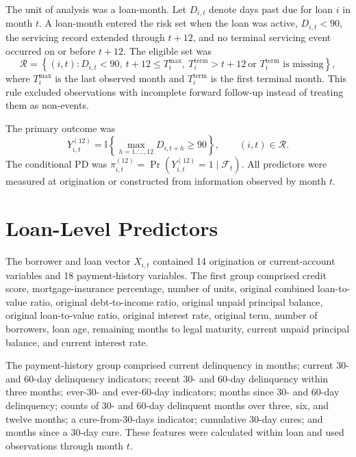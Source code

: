 The unit of analysis was a loan-month. Let $D_{i,t}$ denote days past due for loan $i$ in month $t$. A loan-month entered the risk set when the loan was active, $D_{i,t}<90$, the servicing record extended through $t+12$, and no terminal servicing event occurred on or before $t+12$. The eligible set was
\begin{equation}
\mathcal{R}
=
\left\{(i,t):D_{i,t}<90,\ t+12\leq T_i^{\max},\
T_i^{\mathrm{term}}>t+12\ \text{or }T_i^{\mathrm{term}}\text{ is missing}\right\},
\label{eq:risk-set}
\end{equation}
where $T_i^{\max}$ is the last observed month and $T_i^{\mathrm{term}}$ is the first terminal month. This rule excluded observations with incomplete forward follow-up instead of treating them as non-events.

The primary outcome was
\begin{equation}
Y_{i,t}^{(12)}
=
\mathbb{I}\!\left\{\max_{h=1,\ldots,12}D_{i,t+h}\geq90\right\},
\qquad (i,t)\in\mathcal{R}.
\label{eq:primary-label}
\end{equation}
The conditional PD was $\pi_{i,t}^{(12)}=\Pr(Y_{i,t}^{(12)}=1\mid\mathcal{F}_t)$. All predictors were measured at origination or constructed from information observed by month $t$.

\section{Loan-Level Predictors}

The borrower and loan vector $X_{i,t}$ contained 14 origination or current-account variables and 18 payment-history variables. The first group comprised credit score, mortgage-insurance percentage, number of units, original combined loan-to-value ratio, original debt-to-income ratio, original unpaid principal balance, original loan-to-value ratio, original interest rate, original term, number of borrowers, loan age, remaining months to legal maturity, current unpaid principal balance, and current interest rate.

The payment-history group comprised current delinquency in months; current 30- and 60-day delinquency indicators; recent 30- and 60-day delinquency within three months; ever-30- and ever-60-day indicators; months since 30- and 60-day delinquency; counts of 30- and 60-day delinquent months over three, six, and twelve months; a cure-from-30-days indicator; cumulative 30-day cures; and months since a 30-day cure. These features were calculated within loan and used observations through month $t$.

